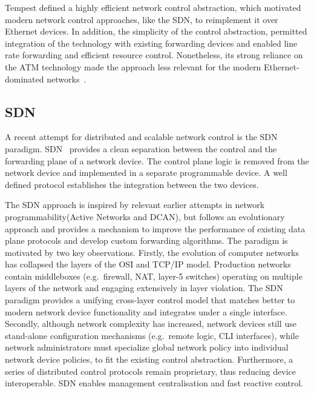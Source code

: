 Tempest defined a highly efficient network control abstraction, which motivated
modern network control approaches, like the SDN, to reimplement it over Ethernet
devices.  In addition, the simplicity of the control abstraction, permitted
integration of the technology with existing forwarding devices  and enabled line
rate forwarding and efficient resource control.  Nonetheless, its strong
reliance on the ATM technology made the approach less relevant for the modern
Ethernet-dominated networks~\cite{Crosby2002}. 

\subsection{SDN}\label{sec:background:sdn} 

A recent attempt for distributed and scalable network control is the SDN
paradigm. SDN~\cite{sdn} provides a clean separation between the control and the
forwarding plane of a network device. The control plane logic is removed from
the network device and implemented in a separate programmable device. A well
defined protocol establishes the integration between the two devices. 

The SDN approach is inspired by relevant earlier attempts in network
programmability(Active Networks and DCAN), but follows an evolutionary approach
and provides a mechanism to improve the performance of existing data plane
protocols and develop custom forwarding algorithms.  The paradigm is motivated
by two key observations.  Firstly, the evolution of computer networks has
collapsed the layers of the OSI and TCP/IP model. Production networks contain
middleboxes (e.g.~firewall, NAT, layer-5 switches) operating on multiple
layers of the network and engaging extensively in layer violation.  
The SDN paradigm provides a unifying cross-layer control model that matches
better to modern network device functionality and integrates under a single
interface.  Secondly, although network complexity has increased, network devices
still use stand-alone configuration mechanisms (e.g.~remote logic, CLI
interfaces), while network administrators must specialize global network policy
into individual network device policies, to fit the existing control
abstraction.  Furthermore, a series of distributed control protocols remain
proprietary, thus reducing device interoperable.  SDN enables management
centralisation and fast reactive control.

